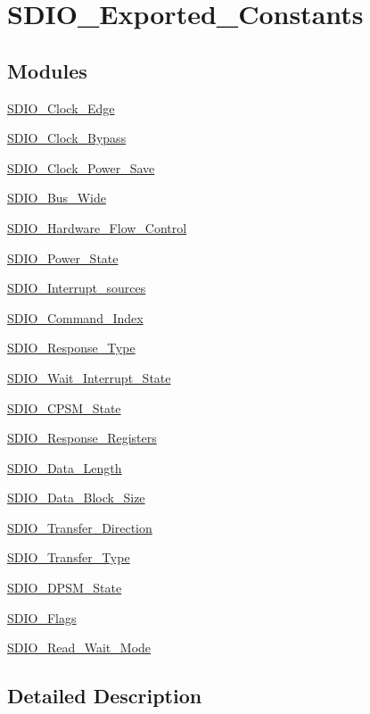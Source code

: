 \hypertarget{group___s_d_i_o___exported___constants}{}\section{S\+D\+I\+O\+\_\+\+Exported\+\_\+\+Constants}
\label{group___s_d_i_o___exported___constants}
\subsection*{Modules}
\begin{DoxyCompactItemize}
\item 
\hyperlink{group___s_d_i_o___clock___edge}{S\+D\+I\+O\+\_\+\+Clock\+\_\+\+Edge}
\item 
\hyperlink{group___s_d_i_o___clock___bypass}{S\+D\+I\+O\+\_\+\+Clock\+\_\+\+Bypass}
\item 
\hyperlink{group___s_d_i_o___clock___power___save}{S\+D\+I\+O\+\_\+\+Clock\+\_\+\+Power\+\_\+\+Save}
\item 
\hyperlink{group___s_d_i_o___bus___wide}{S\+D\+I\+O\+\_\+\+Bus\+\_\+\+Wide}
\item 
\hyperlink{group___s_d_i_o___hardware___flow___control}{S\+D\+I\+O\+\_\+\+Hardware\+\_\+\+Flow\+\_\+\+Control}
\item 
\hyperlink{group___s_d_i_o___power___state}{S\+D\+I\+O\+\_\+\+Power\+\_\+\+State}
\item 
\hyperlink{group___s_d_i_o___interrupt__sources}{S\+D\+I\+O\+\_\+\+Interrupt\+\_\+sources}
\item 
\hyperlink{group___s_d_i_o___command___index}{S\+D\+I\+O\+\_\+\+Command\+\_\+\+Index}
\item 
\hyperlink{group___s_d_i_o___response___type}{S\+D\+I\+O\+\_\+\+Response\+\_\+\+Type}
\item 
\hyperlink{group___s_d_i_o___wait___interrupt___state}{S\+D\+I\+O\+\_\+\+Wait\+\_\+\+Interrupt\+\_\+\+State}
\item 
\hyperlink{group___s_d_i_o___c_p_s_m___state}{S\+D\+I\+O\+\_\+\+C\+P\+S\+M\+\_\+\+State}
\item 
\hyperlink{group___s_d_i_o___response___registers}{S\+D\+I\+O\+\_\+\+Response\+\_\+\+Registers}
\item 
\hyperlink{group___s_d_i_o___data___length}{S\+D\+I\+O\+\_\+\+Data\+\_\+\+Length}
\item 
\hyperlink{group___s_d_i_o___data___block___size}{S\+D\+I\+O\+\_\+\+Data\+\_\+\+Block\+\_\+\+Size}
\item 
\hyperlink{group___s_d_i_o___transfer___direction}{S\+D\+I\+O\+\_\+\+Transfer\+\_\+\+Direction}
\item 
\hyperlink{group___s_d_i_o___transfer___type}{S\+D\+I\+O\+\_\+\+Transfer\+\_\+\+Type}
\item 
\hyperlink{group___s_d_i_o___d_p_s_m___state}{S\+D\+I\+O\+\_\+\+D\+P\+S\+M\+\_\+\+State}
\item 
\hyperlink{group___s_d_i_o___flags}{S\+D\+I\+O\+\_\+\+Flags}
\item 
\hyperlink{group___s_d_i_o___read___wait___mode}{S\+D\+I\+O\+\_\+\+Read\+\_\+\+Wait\+\_\+\+Mode}
\end{DoxyCompactItemize}


\subsection{Detailed Description}
